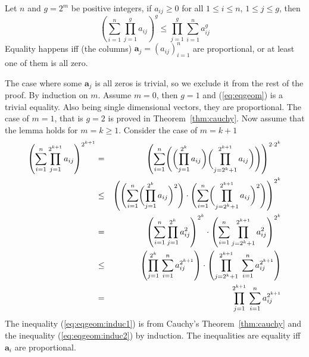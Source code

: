 \begin{lem} \label{lem:eqgeom}
Let $n$ and $g=2^m$ be positive integers,
if \(a_{ij}\geq 0\)
for all \(1\leq i \leq n\), \(1\leq j \leq g\),
then
\begin{equation} \label{eq:eqgeom}
 \left(\sum_{i=1}^n \prod_{j=1}^g a_{ij}\right)^g
 \leq
 \prod_{j=1}^g \sum_{i=1}^n a_{ij}^g
\end{equation}
Equality happens iff (the columns)
\(\mathbf{a}_j = (a_{ij})_{i=1}^n\) are proportional, or at least
one of them is all zero.
\end{lem}
\begin{thmproof}
The case where some \(\mathbf{a}_j\) is all zeros is trivial,
so we exclude it from the rest of the proof.
By induction on $m$.
Assume \(m=0\), then \(g=1\) and (\ref{eq:eqgeom}) is a trivial equality.
Also being single dimensional vectors, they are proportional.
The case of \(m=1\), that is \(g=2\) is proved in Theorem~\ref{thm:cauchy}.
Now assume that the lemma holds for \(m=k\geq 1\).
Consider the case of \(m=k+1\)
\begin{eqnarray}
 \left(\sum_{i=1}^{n} \prod_{j=1}^{2^{k+1}} a_{ij}\right)^{2^{k+1}}
 &=& \notag
 \left(\sum_{i=1}^{n}
       \Biggl(
       \biggl(\prod_{j=1}^{2^k} a_{ij}\biggr)
       \biggl(\prod_{j=2^k + 1}^{2^{k+1}} a_{ij}\biggr)
       \Biggr)
 \right)^{2\cdot 2^k} \\
 &\leq& \label{eq:eqgeom:induc1}
 \left(
 \Biggl(\sum_{i=1}^{n}
       \biggl(\prod_{j=1}^{2^k} a_{ij}\biggr)^2
 \Biggr)
 \cdot
 \Biggl(\sum_{i=1}^{n}
       \biggl(\prod_{j=2^k+1}^{2^{k+1}} a_{ij}\biggr)^2
 \Biggr)
 \right)^{2^k} \\
 &=& \notag
 \left(\sum_{i=1}^{n}
       \prod_{j=1}^{2^k} a_{ij}^2
 \right)^{2^k}
 \cdot
 \left(\sum_{i=1}^{n}
       \prod_{j=2^k+1}^{2^{k+1}} a_{ij}^2
 \right) ^{2^k}
 \\
 &\leq& \label{eq:eqgeom:induc2}
 \left(\prod_{j=1}^{2^k} \,\sum_{i=1}^n a_{ij}^{2^{k+1}}\right)
 \cdot
 \left(\prod_{j=2^k+1}^{2^{k+1}} \;\sum_{i=1}^n a_{ij}^{2^{k+1}}\right) \\
 &=& \notag
 \prod_{j=1}^{2^{k+1}} \,\sum_{i=1}^n a_{ij}^{2^{k+1}}
\end{eqnarray}
The inequality (\ref{eq:eqgeom:induc1}) is from Cauchy's Theorem~\ref{thm:cauchy}
and the inequality (\ref{eq:eqgeom:induc2}) by induction.
The inequalities are equality iff \(\mathbf{a}_i\) are proportional.
\end{thmproof}

